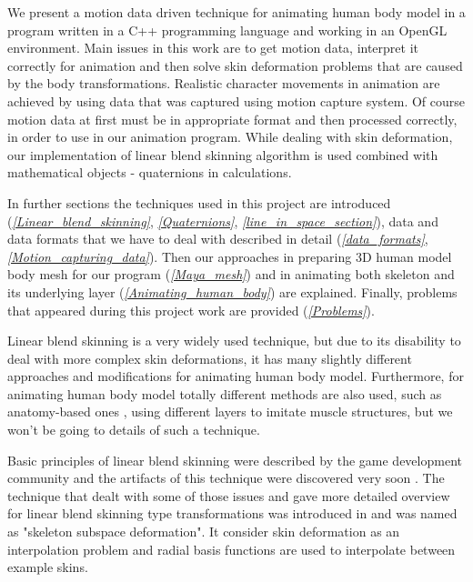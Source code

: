 \documentclass[times, 10pt,twocolumn]{article}
\begin{document}

We present a motion data driven technique for animating human body model in a program written in a C++ programming language and working in an OpenGL environment.
Main issues in this work are to get motion data, interpret it correctly for animation and then solve skin deformation problems that are caused by the body transformations.
Realistic character movements in animation are achieved by using data that was captured using motion capture system. Of course motion data at first must be in appropriate format and then processed correctly, in order to use in our animation program. While dealing with skin deformation, our implementation of linear blend skinning algorithm is used combined with mathematical objects - quaternions in calculations.

In further sections the techniques used in this project are introduced (\emph{\ref{Linear_blend_skinning}}, \emph{\ref{Quaternions}}, \emph{\ref{line_in_space_section}}), data and data formats that we have to deal with described in detail (\emph{\ref{data_formats}}, \emph{\ref{Motion_capturing_data}}). Then our approaches in preparing 3D human model body mesh for our program (\emph{\ref{Maya_mesh}}) and in animating both skeleton and its underlying layer (\emph{\ref{Animating_human_body}}) are explained. Finally, problems that appeared during this project work are provided (\emph{\ref{Problems}}).



Linear blend skinning is a very widely used technique, but due to its disability to deal with more complex skin deformations, it has many slightly different approaches and modifications for animating human body model. Furthermore, for animating human body model totally different methods are also used, such as anatomy-based ones \cite{ex8}, using different layers to imitate muscle structures, but we won't be going to details of such a technique.

Basic principles of linear blend skinning were described by the game development community \cite{ex13,ex14,ex10} and the artifacts of this technique were discovered very soon \cite{ex15}.
The technique that dealt with some of those issues and gave more detailed overview for linear blend skinning type transformations was introduced in \cite{ex12} and was named as "skeleton subspace deformation". It consider skin deformation as an interpolation problem and radial basis functions are used to interpolate between example skins.
\end{document}
